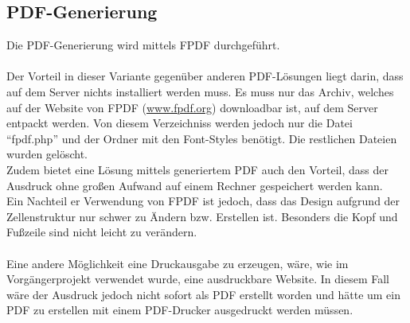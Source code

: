 \subsection{PDF-Generierung}
Die PDF-Generierung wird mittels FPDF durchgeführt.\\
\\
Der Vorteil in dieser Variante gegenüber anderen PDF-Lösungen liegt darin, dass auf dem Server nichts installiert werden muss. Es muss nur das Archiv, welches auf der Website von FPDF (\href{www.fpdf.org}{www.fpdf.org}) downloadbar ist, auf dem Server entpackt werden. Von diesem Verzeichniss werden jedoch nur die Datei \enquote{fpdf.php} und der Ordner mit den Font-Styles benötigt. Die restlichen Dateien wurden gelöscht.\\
Zudem bietet eine Lösung mittels generiertem PDF auch den Vorteil, dass der Ausdruck ohne großen Aufwand auf einem Rechner gespeichert werden kann.
\\
Ein Nachteil er Verwendung von FPDF ist jedoch, dass das Design aufgrund der Zellenstruktur nur schwer zu Ändern bzw. Erstellen ist. Besonders die Kopf und Fußzeile sind nicht leicht zu verändern.\\\\
Eine andere Möglichkeit eine Druckausgabe zu erzeugen, wäre, wie im Vorgängerprojekt verwendet wurde, eine ausdruckbare Website. In diesem Fall wäre der Ausdruck jedoch nicht sofort als PDF erstellt worden und hätte um ein PDF zu erstellen mit einem PDF-Drucker ausgedruckt werden müssen.
